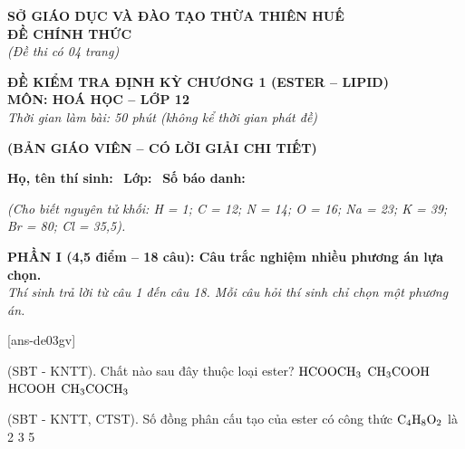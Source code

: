 \documentclass[12pt,a4paper]{article}
\begin{document}
\thispagestyle{firstpage}

\noindent
\begin{minipage}[t]{0.44\textwidth}
	\centering\fontsize{10pt}{12pt}\selectfont
	\textbf{SỞ GIÁO DỤC VÀ ĐÀO TẠO THỪA THIÊN HUẾ}\\
	\textbf{ĐỀ CHÍNH THỨC}\\
	\textit{(Đề thi có 04 trang)}
\end{minipage}\hfill
\begin{minipage}[t]{0.54\textwidth}
	\centering\small
	\textbf{ĐỀ KIỂM TRA ĐỊNH KỲ CHƯƠNG 1 (ESTER -- LIPID)}\\
	\textbf{MÔN: HOÁ HỌC -- LỚP 12}\\
	\textit{Thời gian làm bài: 50 phút (không kể thời gian phát đề)}\\
\end{minipage}

\smallskip
\begin{center}
	{\color{hfRed}\textbf{\large (BẢN GIÁO VIÊN -- CÓ LỜI GIẢI CHI TIẾT)}}
\end{center}

\smallskip
\noindent\hrulefill
\smallskip

\noindent\textbf{Họ, tên thí sinh:} \dotfill\ \textbf{Lớp:} \dotfill\ \textbf{Số báo danh:} \dotfill

\smallskip
\noindent\textit{(Cho biết nguyên tử khối: H = 1; C = 12; N = 14; O = 16; Na = 23; K = 39; Br = 80; Cl = 35,5).}
\smallskip

\noindent
\textbf{PHẦN I (4,5 điểm -- 18 câu): Câu trắc nghiệm nhiều phương án lựa chọn.}\\
\textit{Thí sinh trả lời từ câu 1 đến câu 18. Mỗi câu hỏi thí sinh chỉ chọn một phương án.}

[ans-de03gv]

\begin{ex}
(SBT - KNTT). Chất nào sau đây thuộc loại ester?
\choice
{\True $\ce{HCOOCH3}$}
{$\ce{CH3COOH}$}
{$\ce{HCOOH}$}
{$\ce{CH3COCH3}$}
\end{ex}

\begin{ex}
(SBT - KNTT, CTST). Số đồng phân cấu tạo của ester có công thức $\ce{C4H8O2}$ là
\choice
{2}
{3}
{}
{5}
\end{ex}
\end{document}

